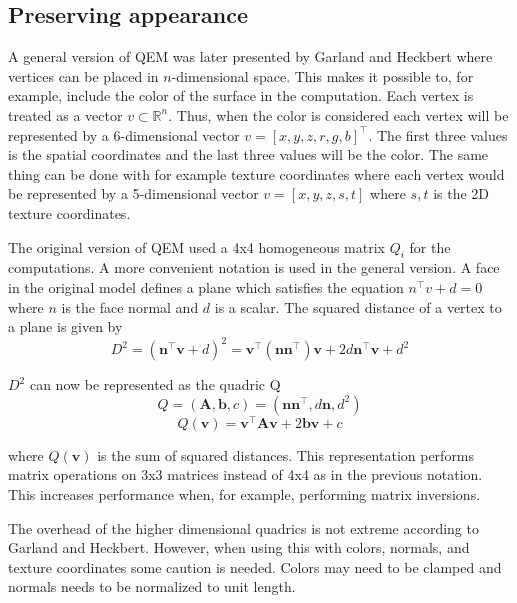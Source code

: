 \subsection{Preserving appearance}
A general version of QEM was later presented by Garland and Heckbert \cite{garland1998simplifying} where vertices can be placed in $n$-dimensional space. This makes it possible to, for example, include the color of the surface in the computation. Each vertex is treated as a vector \(v \subset \mathbb{R}^n\). Thus, when the color is considered each vertex will be represented by a 6-dimensional vector \(v = [x, y, z, r, g, b]^\intercal\). The first three values is the spatial coordinates and the last three values will be the color. The same thing can be done with for example texture coordinates where each vertex would be represented by a 5-dimensional vector \(v = [x, y, z, s, t]\) where $s, t$ is the 2D texture coordinates.

The original version of QEM used a 4x4 homogeneous matrix $Q_i$ for the computations. A more convenient notation is used in the general version. A face in the original model defines a plane which satisfies the equation \(n^{\intercal}v + d = 0\) where $n$ is the face normal and $d$ is a scalar. The squared distance of a vertex to a plane is given by
\begin{equation}
  D^2 = (\mathbf{n}^\intercal\mathbf{v} + d)^2 = \mathbf{v}^\intercal(\mathbf{nn}^\intercal)\mathbf{v} + 2d\mathbf{n}^\intercal\mathbf{v} + d^2
\end{equation}

$D^2$ can now be represented as the quadric Q
\begin{equation}
  Q = (\mathbf{A}, \mathbf{b}, c) = (\mathbf{nn}^\intercal, d\mathbf{n}, d^2)
\end{equation}
\begin{equation}
  Q(\mathbf{v}) = \mathbf{v}^\intercal\mathbf{Av} + 2\mathbf{bv} + c
\end{equation}

where \(Q(\mathbf{v})\) is the sum of squared distances. This representation performs matrix operations on 3x3 matrices instead of 4x4 as in the previous notation. This increases performance when, for example, performing matrix inversions.

The overhead of the higher dimensional quadrics is not extreme according to Garland and Heckbert. However, when using this with colors, normals, and texture coordinates some caution is needed. Colors may need to be clamped and normals needs to be normalized to unit length.

